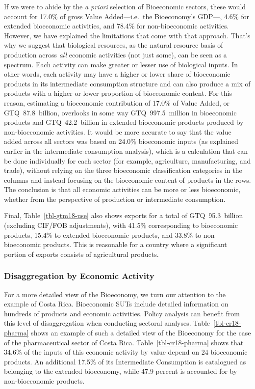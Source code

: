 \documentclass[
  letterpaper,
  DIV=11,
  numbers=noendperiod]{scrartcl}
\begin{document}
If we were to abide by the \emph{a priori} selection of Bioeconomic
sectors, these would account for 17.0\% of gross Value Added---i.e.~the
Bioeconomy's GDP---, 4.6\% for extended bioeconomic activities, and
78.4\% for non-bioeconomic activities. However, we have explained the
limitations that come with that approach. That's why we suggest that
biological resources, as the natural resource basis of production across
\emph{all} economic activities (not just some), can be seen as a
spectrum. Each activity can make greater or lesser use of biological
inputs. In other words, each activity may have a higher or lower share
of bioeconomic products in its intermediate consumption structure and
can also produce a mix of products with a higher or lower proportion of
bioeconomic content. For this reason, estimating a bioeconomic
contribution of 17.0\% of Value Added, or GTQ~87.8~billion, overlooks in
some way GTQ~997.5~million in bioeconomic products and GTQ~42.2~billion
in extended bioeconomic products produced by non-bioeconomic activities.
It would be more accurate to say that the value added across all sectors
was based on 24.0\% bioeconomic inputs (as explained earlier in the
intermediate consumption analysis), which is a calculation that can be
done individually for each sector (for example, agriculture,
manufacturing, and trade), without relying on the three bioeconomic
classification categories in the columns and instead focusing on the
bioeconomic content of products in the rows. The conclusion is that all
economic activities can be more or less bioeconomic, whether from the
perspective of production or intermediate consumption.

Final, Table~\ref{tbl-gtm18-use} also shows exports for a total of
GTQ~95.3~billion (excluding CIF/FOB adjustments), with 41.5\%
corresponding to bioeconomic products, 15.4\% to extended bioeconomic
products, and 33.8\% to non-bioeconomic products. This is reasonable for
a country where a significant portion of exports consists of
agricultural products.

\subsubsection{Disaggregation by Economic
Activity}\label{disaggregation-by-economic-activity}

For a more detailed view of the Bioeconomy, we turn our attention to the
example of Costa Rica. Bioeconomic SUTs include detailed information on
hundreds of products and economic activities. Policy analysis can
benefit from this level of disaggregation when conducting sectoral
analyses. Table~\ref{tbl-cr18-pharma} shows an example of such a
detailed view of the Bioeconomy for the case of the pharmaceutical
sector of Costa Rica. Table~\ref{tbl-cr18-pharma} shows that 34.6\% of
the inputs of this economic activity by value depend on 24 bioeconomic
products. An additional 17.5\% of its Intermediate Consumption is
catalogued as belonging to the extended bioeconomy, while 47.9 percent
is accounted for by non-bioeconomic products.
\end{document}

